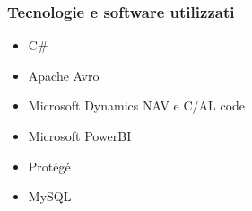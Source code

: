 \documentclass{beamer}
\begin{document}
\begin{frame}
\frametitle{Tecnologie e software utilizzati}
\begin{itemize}
\item C\#
\item Apache Avro
\item Microsoft Dynamics NAV e C/AL code%
\item Microsoft PowerBI
\item Protégé
\item MySQL
\end{itemize}	
\end{frame}

\end{document}
